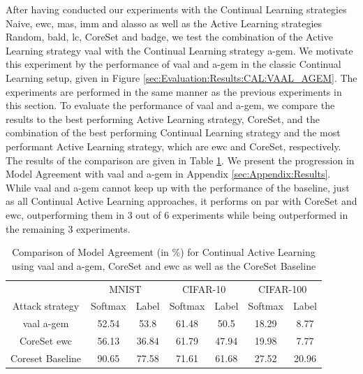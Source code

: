 After having conducted our experiments with the Continual Learning strategies Naive, \gls{ewc}, \gls{mas}, \gls{imm} and \gls{alasso} as well as the Active Learning strategies
Random, \gls{bald}, \gls{lc}, CoreSet and \gls{badge}, we test the combination of the Active Learning strategy \gls{vaal} with the Continual Learning strategy \gls{a-gem}. We motivate
this experiment by the performance of \gls{vaal} and \gls{a-gem} in the classic Continual Learning setup, given in Figure \ref{sec:Evaluation:Results:CAL:VAAL_AGEM}.
The experiments are performed in the same manner as the previous experiments in this section. To evaluate the performance of \gls{vaal} and \gls{a-gem}, we compare
the results to the best performing Active Learning strategy, CoreSet, and the combination of the best performing Continual Learning strategy and the
most performant Active Learning strategy, which are \gls{ewc} and CoreSet, respectively. The results of the comparison are given in Table 
\ref{fig:ModelStealingVAALAGEM}. We present the progression in Model Agreement with \gls{vaal} and \gls{a-gem} in Appendix \ref{sec:Appendix:Results}. While \gls{vaal}
and \gls{a-gem} cannot keep up with the performance of the baseline, just as all Continual Active Learning approaches, it performs on par with CoreSet and \gls{ewc},
outperforming them in 3 out of 6 experiments while being outperformed in the remaining 3 experiments. \par
\begin{table}[h]
    \centering
    \begin{tabular}{c c c c c c c} 
        \hline
        & \multicolumn{2}{c}{MNIST} & \multicolumn{2}{c}{CIFAR-10} & \multicolumn{2}{c}{CIFAR-100} \\ 
        \cline{2-7} Attack strategy & Softmax & Label & Softmax & Label & Softmax & Label \\
        \hline 
        \gls{vaal} \gls{a-gem} & 52.54 & 53.8 & 61.48 & 50.5 & 18.29 & 8.77\\
        CoreSet \gls{ewc} & 56.13 & 36.84 & 61.79 & 47.94 & 19.98 & 7.77 \\
        Coreset Baseline & 90.65 & 77.58 & 71.61 & 61.68 & 27.52 & 20.96\\
        \hline
    \end{tabular}
    \caption[Comparison of Model Agreement using \gls{vaal} and \gls{a-gem}]{Comparison of Model Agreement (in \%) for Continual Active Learning using \gls{vaal}
     and \gls{a-gem}, CoreSet and \gls{ewc} as well as the CoreSet Baseline}
    \label{fig:ModelStealingVAALAGEM}
\end{table}
